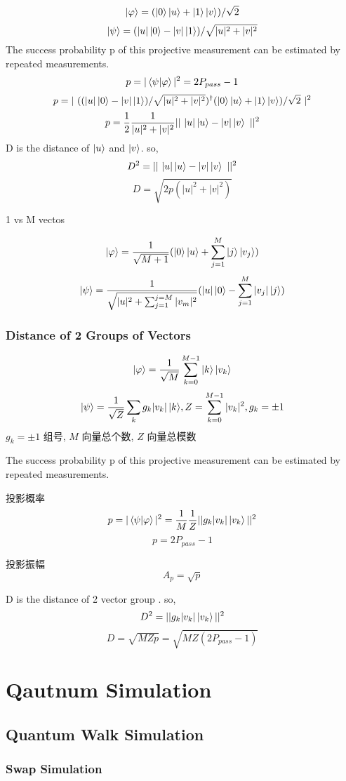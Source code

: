 \documentclass{article}
\begin{document}
\[  \ket{\varphi}=(\ket{0}\ket{u}+\ket{1}\ket{v})/\sqrt{2}
\]
\[  \ket{\psi}=(|u|\ket{0}-|v|\ket{1})/\sqrt{|u|^{2}+|v|^{2}}
\]
The success probability p of this projective measurement
can be estimated by repeated measurements.
\[  p=|\braket{\psi|\varphi}|^{2} = 2P_{pass}-1\]
\[
    p=|\   ((|u|\ket{0}-|v|\ket{1})/\sqrt{|u|^{2}+|v|^{2}})^{\dag}(\ket{0}\ket{u}+\ket{1}\ket{v})/\sqrt{2}\ |^{2}
\]
$$ p=\frac{1}{2}\frac{1}{|u|^{2}+|v|^{2}}||\ |u|\ket{u}-|v|\ket{v}\ ||^{2} $$
D is the distance of $\ket{u}$ and $\ket{v}$. so,\\
$$ D^{2}=||\ |u|\ket{u}-|v|\ket{v}\ ||^{2} $$
$$ D=\sqrt{2p(|u|^{2}+|v|^{2})} $$

1 vs M vectos


\[  \ket{\varphi}=\frac{1}{{\sqrt{M+1}}}(\ket{0}\ket{u}+\sum_{j=1}^{M}\ket{j}\ket{v_j})
\]
\[  \ket{\psi}=\frac{1}{\sqrt{|u|^{2}+\sum_{j=1}^{j=M}|v_m|^{2}}}(|u|\ket{0}-\sum_{j=1}^{M}|v_j|\ket{j})
\]

\subsubsection{ Distance of 2 Groups of Vectors}

\[  \ket{\varphi}= \frac{1}{ \sqrt{M} }  \sum_{k=0}^{M-1} { \ket{k}\ket{v_k} } 
\]
$$  \ket{\psi}=\frac{1}{ \sqrt{Z} }  \sum_k{ g_k  |v_k| \ket{k} } 
,  Z=  \sum_{k=0}^{M-1} {  |v_k|^2  }, g_k=\pm1 
$$
$g_k=\pm1$ 组号, $M$ 向量总个数, $Z$ 向量总模数

The success probability p of this projective measurement
can be estimated by repeated measurements.

投影概率
$$  p=|\braket{\psi|\varphi}|^{2}   = \frac{1}{ M }  \frac{1}{Z} ||g_k  |v_k| \ket{v_k}  ||^{2}  $$
$$ p = 2P_{pass}-1 $$

投影振幅
$$ A_p = \sqrt{p} $$

D is the distance of 2 vector group . so,\\
$$ D^{2}=||g_k  |v_k| \ket{v_k}  ||^{2} $$
$$ D=\sqrt{ M Z p }  = \sqrt{ M Z (2P_{pass}-1)}  $$

\section{Qautnum Simulation}
\subsection{Quantum Walk Simulation}
\subsubsection{Swap Simulation}
\end{document}
